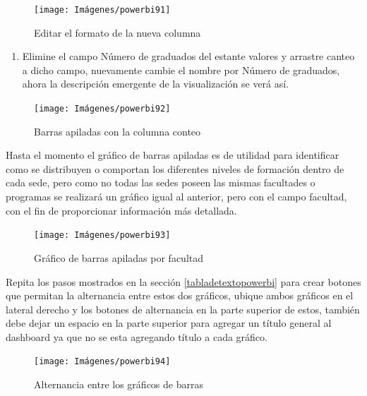 \documentclass[
]{book}
\providecommand{\tightlist}{%
  \setlength{\itemsep}{0pt}\setlength{\parskip}{0pt}}
\begin{document}
\begin{figure}

{\centering \texttt{[image: Imágenes/powerbi91]} 

}

\caption{Editar el formato de la nueva columna}\label{fig:paso2crearconteo-fig}
\end{figure}

\begin{enumerate}
\def\labelenumi{\arabic{enumi}.}
\setcounter{enumi}{2}
\tightlist
\item
  Elimine el campo Número de graduados del estante valores y arrastre canteo a dicho campo, nuevamente cambie el nombre por Número de graduados, ahora la descripción emergente de la visualización se verá así.
\end{enumerate}

\begin{figure}

{\centering \texttt{[image: Imágenes/powerbi92]} 

}

\caption{Barras apiladas con la columna conteo}\label{fig:paso3crearconteo-fig}
\end{figure}

Hasta el momento el gráfico de barras apiladas es de utilidad para identificar como se distribuyen o comportan los diferentes niveles de formación dentro de cada sede, pero como no todas las sedes poseen las mismas facultades o programas se realizará un gráfico igual al anterior, pero con el campo facultad, con el fin de proporcionar información más detallada.

\begin{figure}

{\centering \texttt{[image: Imágenes/powerbi93]} 

}

\caption{Gráfico de barras apiladas por facultad}\label{fig:barrasapiladasfacultad-fig}
\end{figure}

Repita los pasos mostrados en la sección \ref{tabladetextopowerbi} para crear botones que permitan la alternancia entre estos dos gráficos, ubique ambos gráficos en el lateral derecho y los botones de alternancia en la parte superior de estos, también debe dejar un espacio en la parte superior para agregar un título general al dashboard ya que no se esta agregando título a cada gráfico.

\begin{figure}

{\centering \texttt{[image: Imágenes/powerbi94]} 

}

\caption{Alternancia entre los gráficos de barras}\label{fig:alternanciaentrebarrasapiladas-fig}
\end{figure}
\end{document}
